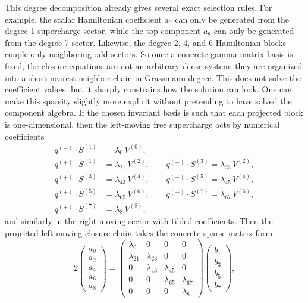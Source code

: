 \documentclass[11pt]{article}
\numberwithin{equation}{section}
\begin{document}
This degree decomposition already gives several exact selection rules. For example, the scalar Hamiltonian coefficient $a_0$ can only be generated from the degree-1 supercharge sector, while the top component $a_8$ can only be generated from the degree-7 sector. Likewise, the degree-2, 4, and 6 Hamiltonian blocks couple only neighboring odd sectors. So once a concrete gamma-matrix basis is fixed, the closure equations are not an arbitrary dense system: they are organized into a short nearest-neighbor chain in Grassmann degree. This does not solve the coefficient values, but it sharply constrains how the solution can look.
One can make this sparsity slightly more explicit without pretending to have solved the component algebra. If the chosen invariant basis is such that each projected block is one-dimensional, then the left-moving free supercharge acts by numerical coefficients
\begin{equation}
\label{eq:s15-019}
\begin{aligned}
q^{(-)}\cdot S^{(1)}&=\lambda_0\,V^{(0)},\\
q^{(+)}\cdot S^{(1)}&=\lambda_{21}\,V^{(2)},
\qquad
q^{(-)}\cdot S^{(3)}=\lambda_{23}\,V^{(2)},\\
q^{(+)}\cdot S^{(3)}&=\lambda_{43}\,V^{(4)},
\qquad
q^{(-)}\cdot S^{(5)}=\lambda_{45}\,V^{(4)},\\
q^{(+)}\cdot S^{(5)}&=\lambda_{65}\,V^{(6)},
\qquad
q^{(-)}\cdot S^{(7)}=\lambda_{67}\,V^{(6)},\\
q^{(+)}\cdot S^{(7)}&=\lambda_8\,V^{(8)},
\end{aligned}
\end{equation}
and similarly in the right-moving sector with tilded coefficients. Then the projected left-moving closure chain takes the concrete sparse matrix form
\begin{equation}
\label{eq:s15-020}
2
\begin{pmatrix}
a_0\\ a_2\\ a_4\\ a_6\\ a_8
\end{pmatrix}
=
\begin{pmatrix}
\lambda_0 & 0 & 0 & 0\\
\lambda_{21} & \lambda_{23} & 0 & 0\\
0 & \lambda_{43} & \lambda_{45} & 0\\
0 & 0 & \lambda_{65} & \lambda_{67}\\
0 & 0 & 0 & \lambda_8
\end{pmatrix}
\begin{pmatrix}
b_1\\ b_3\\ b_5\\ b_7
\end{pmatrix},
\end{equation}
\end{document}
